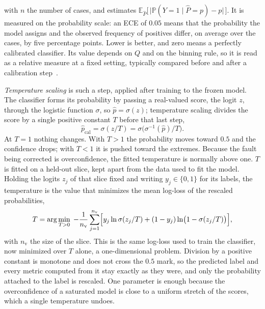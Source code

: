         with $n$ the number of cases, and estimates
        $\mathbb{E}_{\hat{P}}\bigl[\, \lvert \mathbb{P}(Y = 1 \mid \hat{P} = p) - p \rvert \,\bigr]$.
        It is measured on the probability scale: an ECE of $0.05$ means that the
        probability the model assigns and the observed frequency of positives
        differ, on average over the cases, by five percentage points. Lower is
        better, and zero means a perfectly calibrated classifier.
        Its value depends on $Q$ and on the binning rule, so it is read as a
        relative measure at a fixed setting, typically compared before and after a
        calibration step~\cite{naeini2015}.

        \emph{Temperature scaling} is such a step, applied after training to the
        frozen model. The classifier forms its probability by passing a real-valued score, the
        logit $z$, through the logistic function $\sigma$, so $\hat{p} = \sigma(z)$;
        temperature scaling divides the score by a single positive constant $T$ before
        that last step,
        \begin{equation}
            \hat{p}_{\mathrm{cal}} = \sigma\!\left( z / T \right)
            = \sigma\!\bigl( \sigma^{-1}(\hat{p}) / T \bigr) .
            \label{eq:bg:unc:temp}
        \end{equation}
        At $T = 1$ nothing changes. With $T > 1$ the probability moves toward $0.5$ and
        the confidence drops; with $T < 1$ it is pushed toward the extremes. Because
        the fault being corrected is overconfidence, the fitted temperature is normally
        above one. $T$ is fitted on a held-out slice, kept apart from the data used to
        fit the model. Holding the logits $z_j$ of that slice fixed and writing
        $y_j \in \{0, 1\}$ for its labels, the temperature is the value that minimizes
        the mean log-loss of the rescaled probabilities,
        \begin{equation}
            T = \arg\min_{T > 0} \; -\frac{1}{n_{\mathrm{v}}} \sum_{j=1}^{n_{\mathrm{v}}}
            \Bigl[ y_j \ln \sigma(z_j / T)
            + (1 - y_j) \ln\bigl( 1 - \sigma(z_j / T) \bigr) \Bigr] ,
            \label{eq:bg:unc:tempfit}
        \end{equation}
        with $n_{\mathrm{v}}$ the size of the slice. This is the same log-loss used to train the
        classifier, now minimized over $T$ alone, a one-dimensional problem.
        Division by a positive constant is monotone and does not cross the $0.5$
        mark, so the predicted label and every metric computed from it stay exactly
        as they were, and only the probability attached to the label is rescaled.
        One parameter is enough because
        the overconfidence of a saturated model is close to a uniform stretch of the
        scores, which a single temperature undoes.
    
